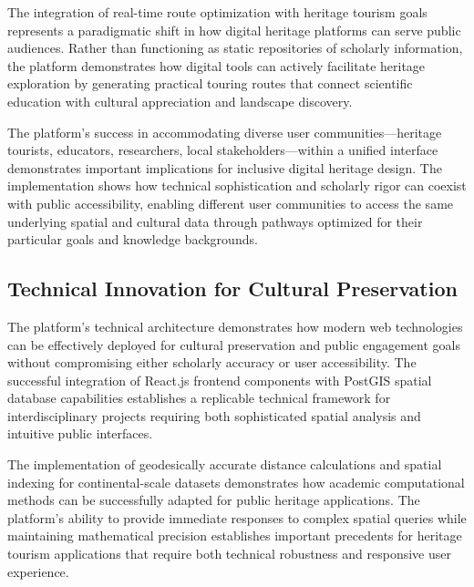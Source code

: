 The integration of real-time route optimization with heritage tourism goals represents a paradigmatic shift in how digital heritage platforms can serve public audiences. Rather than functioning as static repositories of scholarly information, the platform demonstrates how digital tools can actively facilitate heritage exploration by generating practical touring routes that connect scientific education with cultural appreciation and landscape discovery.


The platform's success in accommodating diverse user communities—heritage tourists, educators, researchers, local stakeholders—within a unified interface demonstrates important implications for inclusive digital heritage design. The implementation shows how technical sophistication and scholarly rigor can coexist with public accessibility, enabling different user communities to access the same underlying spatial and cultural data through pathways optimized for their particular goals and knowledge backgrounds.

\subsection{Technical Innovation for Cultural Preservation}
\label{subsec:technical_innovation}

The platform's technical architecture demonstrates how modern web technologies can be effectively deployed for cultural preservation and public engagement goals without compromising either scholarly accuracy or user accessibility. The successful integration of React.js frontend components with PostGIS spatial database capabilities establishes a replicable technical framework for interdisciplinary projects requiring both sophisticated spatial analysis and intuitive public interfaces.

The implementation of geodesically accurate distance calculations and spatial indexing for continental-scale datasets demonstrates how academic computational methods can be successfully adapted for public heritage applications. The platform's ability to provide immediate responses to complex spatial queries while maintaining mathematical precision establishes important precedents for heritage tourism applications that require both technical robustness and responsive user experience.

